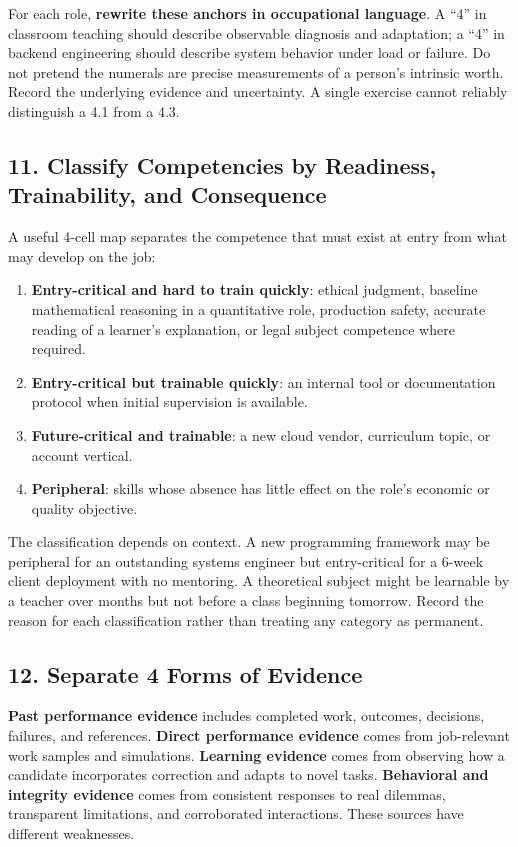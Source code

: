 For each role, \textbf{rewrite these anchors in occupational language}. A ``4'' in classroom teaching should describe observable diagnosis and adaptation; a ``4'' in backend engineering should describe system behavior under load or failure. Do not pretend the numerals are precise measurements of a person's intrinsic worth. Record the underlying evidence and uncertainty. A single exercise cannot reliably distinguish a 4.1 from a 4.3.

\subsection*{11. Classify Competencies by Readiness, Trainability, and Consequence}

A useful 4-cell map separates the competence that must exist at entry from what may develop on the job:
\begin{enumerate}[leftmargin=*]
\item \textbf{Entry-critical and hard to train quickly}: ethical judgment, baseline mathematical reasoning in a quantitative role, production safety, accurate reading of a learner's explanation, or legal subject competence where required.
\item \textbf{Entry-critical but trainable quickly}: an internal tool or documentation protocol when initial supervision is available.
\item \textbf{Future-critical and trainable}: a new cloud vendor, curriculum topic, or account vertical.
\item \textbf{Peripheral}: skills whose absence has little effect on the role's economic or quality objective.
\end{enumerate}

The classification depends on context. A new programming framework may be peripheral for an outstanding systems engineer but entry-critical for a 6-week client deployment with no mentoring. A theoretical subject might be learnable by a teacher over months but not before a class beginning tomorrow. Record the reason for each classification rather than treating any category as permanent.

\subsection*{12. Separate 4 Forms of Evidence}

\textbf{Past performance evidence} includes completed work, outcomes, decisions, failures, and references. \textbf{Direct performance evidence} comes from job-relevant work samples and simulations. \textbf{Learning evidence} comes from observing how a candidate incorporates correction and adapts to novel tasks. \textbf{Behavioral and integrity evidence} comes from consistent responses to real dilemmas, transparent limitations, and corroborated interactions. These sources have different weaknesses.

